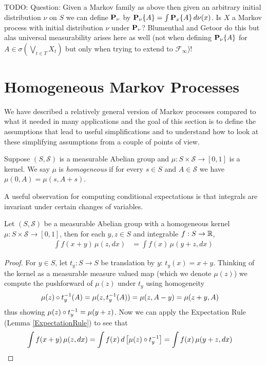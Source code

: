 TODO: Question:  Given a Markov family as above then given an arbitrary
initial distribution $\nu$ on $S$ we can define $\probabilityop_\nu$
by $\sprobability{A}{\nu} = \int \sprobability{A}{x} \, d\nu(x)$.  Is
$X$ a Markov process with initial distribution $\nu$ under
$\probabilityop_\nu$?  Blumenthal and Getoor do this but alas universal measurability arises here as well (not when defining
$\sprobability{A}{\nu}$ for $A \in \sigma(\bigvee_{t \in T} X_t)$ but only when trying to extend to $\mathcal{F}_\infty$)!

\section{Homogeneous Markov Processes}

We have described a relatively general version of Markov processes
compared to what it needed in many applications and the goal of this
section is to define the assumptions that lead to useful
simplifications and to understand how to look at these simplifying
assumptions from a couple of points of view.

\begin{defn}Suppose $(S, \mathcal{S})$ is a measurable Abelian group
  and $\mu : S \times \mathcal{S} \to [0,1]$ is a kernel.  We say
  $\mu$ is \emph{homogeneous} if for every $s \in S$ and
  $A\in \mathcal{S}$ we have $\mu(0, A) = \mu(s, A+s)$.
\end{defn}

A useful observation for computing conditional expectations is that
integrals are invariant under certain changes of variables.
\begin{lem}\label{HomogeneousKernelExpectationRule}Let $(S, \mathcal{S})$ be a measurable Abelian group with a
  homogeneous kernel $\mu : S \times \mathcal{S} \to [0,1]$, then for
  each $y,z \in S$ and integrable $f : S \to \reals$,
\begin{align*}
\int f(x + y) \, \mu(z, dx) &= \int f(x) \, \mu(y+z, dx)
\end{align*}
\end{lem}
\begin{proof}
For $y \in S$, let $t_y : S \to S$ be translation by $y$: $t_y(x) = x
+ y$.  Thinking of the kernel as a measurable measure
valued map (which we denote $\mu(z)$) we compute the pushforward of $\mu(z)$ under $t_y$
using homogeneity
\begin{align*}
\pushforward {t_y}{\mu(z)}(A) &= \mu(z, t_y^{-1}(A)) = \mu(z, A
- y) = \mu(z+y, A)
\end{align*}
thus showing $\pushforward {t_y}{\mu(z)} = \mu(y+z)$.
Now we can apply the Expectation Rule (Lemma \ref{ExpectationRule}) to
see that 
\begin{align*}
\int f(x + y) \, \mu(z, dx) &= \int f(x) \, d\left [ \pushforward {t_y}{\mu(z)} \right] = \int f(x) \, \mu(y+z, dx)
\end{align*}
\end{proof}

